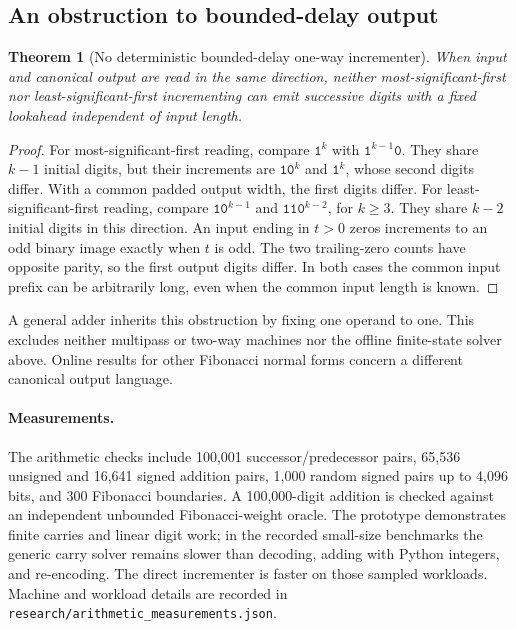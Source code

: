 \documentclass[11pt]{article}
\newtheorem{theorem}{Theorem}[section]
\theoremstyle{definition}\newtheorem{definition}[theorem]{Definition}
\begin{document}
\subsection{An obstruction to bounded-delay output}
\begin{theorem}[No deterministic bounded-delay one-way incrementer]
When input and canonical output are read in the same direction, neither
most-significant-first nor least-significant-first incrementing can emit
successive digits with a fixed lookahead independent of input length.
\end{theorem}
\begin{proof}
For most-significant-first reading, compare $\texttt{1}^k$ with
$\texttt{1}^{k-1}\texttt{0}$. They share $k-1$ initial digits, but their
increments are $\texttt{1}\texttt{0}^k$ and $\texttt{1}^k$, whose second
digits differ. With a common padded output width, the first digits differ.
For least-significant-first reading, compare
$\texttt{1}\texttt{0}^{k-1}$ and $\texttt{11}\texttt{0}^{k-2}$, for
$k\ge3$. They share $k-2$ initial digits in this direction. An input
ending in $t>0$ zeros increments to an odd binary image exactly when
$t$ is odd. The two trailing-zero counts have opposite parity, so the
first output digits differ. In both cases the common input prefix can
be arbitrarily long, even when the common input length is known.
\end{proof}
A general adder inherits this obstruction by fixing one operand to one.
This excludes neither multipass or two-way machines nor the offline
finite-state solver above. Online results for other Fibonacci normal
forms \cite{online} concern a different canonical output language.

\paragraph{Measurements.}
The arithmetic checks include 100,001 successor/predecessor pairs,
65,536 unsigned and 16,641 signed addition pairs, 1,000 random signed
pairs up to 4,096 bits, and 300 Fibonacci boundaries. A 100,000-digit
addition is checked against an independent unbounded Fibonacci-weight
oracle. The prototype demonstrates finite carries and linear digit work;
in the recorded small-size benchmarks the generic carry solver remains
slower than decoding, adding with Python integers, and re-encoding.
The direct incrementer is faster on those sampled workloads.
Machine and workload details are recorded in
\texttt{research/arithmetic\_measurements.json}.
\end{document}
